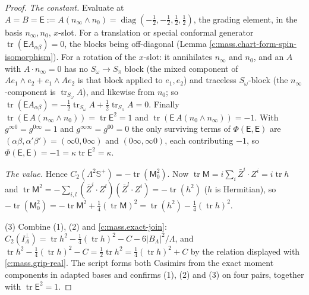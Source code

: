 \documentclass[11pt]{article}
\theoremstyle{definition}
\theoremstyle{plain}
\providecommand{\CS}{}\renewcommand{\CS}{{\mathbb{S}^{+}}}
\providecommand{\Som}{}\renewcommand{\Som}{S_\omega}
\providecommand{\Spi}{}\renewcommand{\Spi}{S_\pi}
\providecommand{\tr}{}\renewcommand{\tr}{\operatorname{tr}}
\begin{document}
\begin{proof}
\emph{The constant.} Evaluate at $A = B = \mathsf{E} := A(n_{\infty}\wedge n_{0}) = \operatorname{diag}(-\tfrac12,-\tfrac12,\tfrac12,\tfrac12)$, the grading element, in the basis $n_{\infty}, n_{0}$, $x$-slot. For a translation or special conformal generator $\tr(\mathsf{E}A_{\alpha\beta}) = 0$, the blocks being off-diagonal (Lemma \ref{c:mass.chart-form-spin-isomorphism}). For a rotation of the $x$-slot: it annihilates $n_{\infty}$ and $n_{0}$, and an $A$ with $A\cdot n_{\infty} = 0$ has no $\Som \to \Spi$ block (the mixed component of $Ae_{1}\wedge e_{2} + e_{1}\wedge Ae_{2}$ is that block applied to $e_{1}, e_{2}$) and traceless $\Som$-block (the $n_{\infty}$-component is $\tr_{\Som}A$), and likewise from $n_{0}$; so $\tr(\mathsf{E}A_{\alpha\beta}) = -\tfrac12\tr_{\Som}A + \tfrac12\tr_{\Spi}A = 0$. Finally $\tr(\mathsf{E}\,A(n_{\infty}\wedge n_{0})) = \tr \mathsf{E}^{2} = 1$ and $\tr(\mathsf{E}\,A(n_{0}\wedge n_{\infty})) = -1$. With $g^{\infty 0} = g^{0\infty} = 1$ and $g^{\infty\infty} = g^{00} = 0$ the only surviving terms of $\Phi(\mathsf{E},\mathsf{E})$ are $(\alpha\beta, \alpha'\beta') = (\infty 0, 0\infty)$ and $(0\infty, \infty 0)$, each contributing $-1$, so $\Phi(\mathsf{E},\mathsf{E}) = -1 = \kappa\tr \mathsf{E}^{2} = \kappa$.

\emph{The value.} Hence $C_{2}(\Lambda^{2}\CS) = -\tr(\mathsf{M}_{0}^{2})$. Now $\tr\mathsf{M} = i\sum_{i}\bar{Z}^{i}\cdot Z^{i} = i\tr h$ and $\tr\mathsf{M}^{2} = -\sum_{i,l}(\bar{Z}^{i}\cdot Z^{l})(\bar{Z}^{l}\cdot Z^{i}) = -\tr(h^{2})$ ($h$ is Hermitian), so $-\tr(\mathsf{M}_{0}^{2}) = -\tr\mathsf{M}^{2} + \tfrac14(\tr\mathsf{M})^{2} = \tr(h^{2}) - \tfrac14(\tr h)^{2}$.

(3) Combine (1), (2) and \ref{c:mass.exact-join}: $C_{2}(I_{\Lambda}^{\perp}) = \tr h^{2} - \tfrac14(\tr h)^{2} - C - 6|B_{\Lambda}|^{2}/\Lambda$, and $\tr h^{2} - \tfrac14(\tr h)^{2} - C = \tfrac12\tr h^{2} = \tfrac14(\tr h)^{2} + C$ by the relation displayed with \ref{c:mass.grip-real}. The script forms both Casimirs from the exact moment components in adapted bases and confirms (1), (2) and (3) on four pairs, together with $\tr\mathsf{E}^{2} = 1$.

\end{proof}
\end{document}
